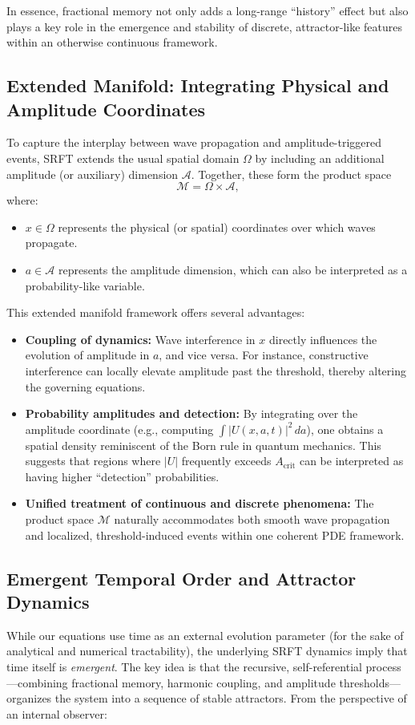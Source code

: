 \documentclass[12pt]{article}
\begin{document}
In essence, fractional memory not only adds a long-range “history” effect but also plays a key role in the emergence and stability of discrete, attractor-like features within an otherwise continuous framework.

\medskip

\subsection{Extended Manifold: Integrating Physical and Amplitude Coordinates}
To capture the interplay between wave propagation and amplitude-triggered events, SRFT extends the usual spatial domain $\Omega$ by including an additional amplitude (or auxiliary) dimension $\mathcal{A}$. Together, these form the product space
\[
  \mathcal{M} = \Omega \times \mathcal{A},
\]
where:
\begin{itemize}
    \item $x \in \Omega$ represents the physical (or spatial) coordinates over which waves propagate.
    \item $a \in \mathcal{A}$ represents the amplitude dimension, which can also be interpreted as a probability-like variable.
\end{itemize}

This extended manifold framework offers several advantages:
\begin{itemize}
    \item \textbf{Coupling of dynamics:} Wave interference in $x$ directly influences the evolution of amplitude in $a$, and vice versa. For instance, constructive interference can locally elevate amplitude past the threshold, thereby altering the governing equations.
    \item \textbf{Probability amplitudes and detection:} By integrating over the amplitude coordinate (e.g., computing $\int |U(x,a,t)|^2\,da$), one obtains a spatial density reminiscent of the Born rule in quantum mechanics. This suggests that regions where $|U|$ frequently exceeds $A_{\mathrm{crit}}$ can be interpreted as having higher “detection” probabilities.
    \item \textbf{Unified treatment of continuous and discrete phenomena:} The product space $\mathcal{M}$ naturally accommodates both smooth wave propagation and localized, threshold-induced events within one coherent PDE framework.
\end{itemize}

\medskip

\subsection{Emergent Temporal Order and Attractor Dynamics}
While our equations use time as an external evolution parameter (for the sake of analytical and numerical tractability), the underlying SRFT dynamics imply that time itself is \emph{emergent}. The key idea is that the recursive, self-referential process—combining fractional memory, harmonic coupling, and amplitude thresholds—organizes the system into a sequence of stable attractors. From the perspective of an internal observer:
\end{document}
